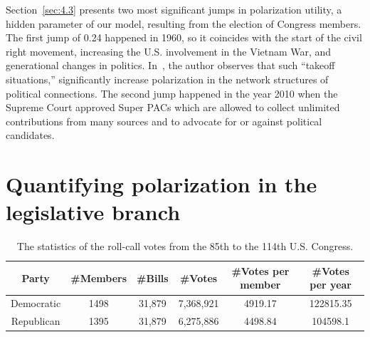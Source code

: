 Section~\ref{sec:4.3} presents two most significant jumps in polarization utility, a hidden parameter of our model, resulting from the election of Congress members. The first jump of 0.24 happened in 1960, so it coincides with the start of the civil right movement, increasing the U.S. involvement in the Vietnam War, and generational changes in politics. In~\cite{baldassarri2007dynamics}, the author observes that such ``takeoff situations,'' significantly increase polarization in the network structures of political connections. The second jump happened in the year 2010 when the Supreme Court approved Super PACs which are allowed to collect unlimited contributions from many sources and to advocate for or against political candidates.

\section{Quantifying polarization in the legislative branch} \label{sec:4.1}

\begin{table}[!ht]
\centering
\caption{The statistics of the roll-call votes from the 85th to the 114th U.S. Congress.}
\begin{tabular}{|c|c|c|c|c|c|}
\hline
Party & \#Members & \#Bills & \#Votes & \#Votes per member & \#Votes per year\\ 
\hline
Democratic & 1498 & 31,879 & 7,368,921 & 4919.17 & 122815.35\\ %
Republican & 1395 & 31,879 & 6,275,886 & 4498.84 & 104598.1 \\ 
\hline
\end{tabular}
\label{table1}
\end{table}

